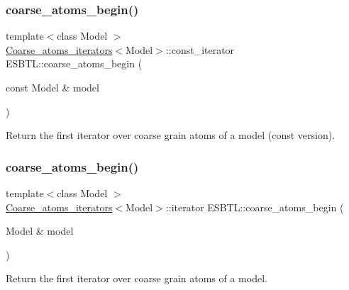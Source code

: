 \mbox{\label{group__grp__iters_gabf07aacb61d906d9cb002b2e585e4eb8}} 
\subsubsection{\texorpdfstring{coarse\+\_\+atoms\+\_\+begin()}{coarse\_atoms\_begin()}\hspace{0.1cm}{\footnotesize\ttfamily [3/4]}}
{\footnotesize\ttfamily template$<$class Model $>$ \\
\hyperlink{structESBTL_1_1Coarse__atoms__iterators}{Coarse\+\_\+atoms\+\_\+iterators}$<$Model$>$\+::const\+\_\+iterator E\+S\+B\+T\+L\+::coarse\+\_\+atoms\+\_\+begin (\begin{DoxyParamCaption}\item[{const Model \&}]{model }\end{DoxyParamCaption})}

Return the first iterator over coarse grain atoms of a model (const version). \mbox{\label{group__grp__iters_ga44b38b942148d622332c4d9d2b483c84}} 
\subsubsection{\texorpdfstring{coarse\+\_\+atoms\+\_\+begin()}{coarse\_atoms\_begin()}\hspace{0.1cm}{\footnotesize\ttfamily [4/4]}}
{\footnotesize\ttfamily template$<$class Model $>$ \\
\hyperlink{structESBTL_1_1Coarse__atoms__iterators}{Coarse\+\_\+atoms\+\_\+iterators}$<$Model$>$\+::iterator E\+S\+B\+T\+L\+::coarse\+\_\+atoms\+\_\+begin (\begin{DoxyParamCaption}\item[{Model \&}]{model }\end{DoxyParamCaption})}

Return the first iterator over coarse grain atoms of a model. \mbox{\label{group__grp__iters_ga50026c05f269eddb69d9d775df51e442}} 
